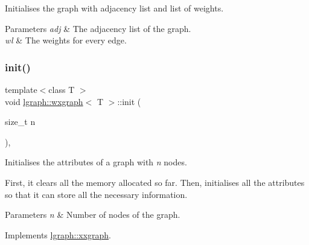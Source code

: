 Initialises the graph with adjacency list and list of weights. 


\begin{DoxyParams}{Parameters}
{\em adj} & The adjacency list of the graph. \\
\hline
{\em wl} & The weights for every edge. \\
\hline
\end{DoxyParams}
\mbox{\label{classlgraph_1_1wxgraph_aa09f37bf4a34a0f4f002587203df0125}} 
\subsubsection{\texorpdfstring{init()}{init()}\hspace{0.1cm}{\footnotesize\ttfamily [2/3]}}
{\footnotesize\ttfamily template$<$class T $>$ \\
void \hyperlink{classlgraph_1_1wxgraph}{lgraph\+::wxgraph}$<$ T $>$\+::init (\begin{DoxyParamCaption}\item[{size\+\_\+t}]{n }\end{DoxyParamCaption})\hspace{0.3cm}{\ttfamily [virtual]}, {\ttfamily [inherited]}}



Initialises the attributes of a graph with {\itshape n} nodes. 

First, it clears all the memory allocated so far. Then, initialises all the attributes so that it can store all the necessary information.


\begin{DoxyParams}{Parameters}
{\em n} & Number of nodes of the graph. \\
\hline
\end{DoxyParams}


Implements \hyperlink{classlgraph_1_1xxgraph_aba97900b2d33e1bb0d31594cf169f0ba}{lgraph\+::xxgraph}.

\mbox{\label{classlgraph_1_1wxgraph_a851ab43d7658c185831413394ef915a9}} 
